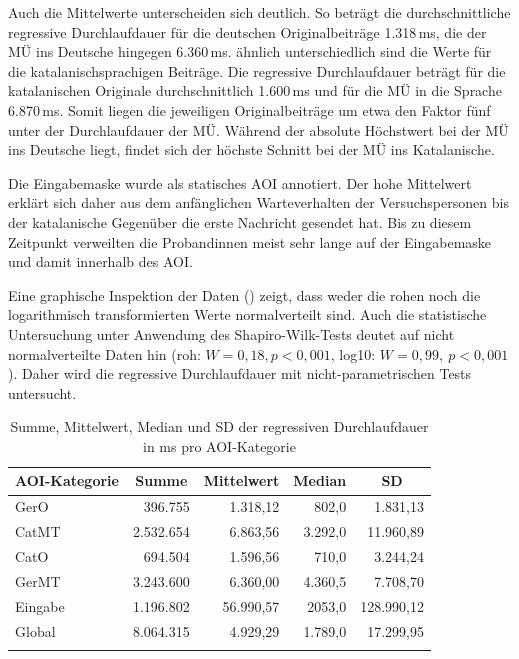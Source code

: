 Auch die Mittelwerte unterscheiden sich deutlich. So beträgt die durchschnittliche regressive Durchlaufdauer für die deutschen Originalbeiträge 1.318\,ms, die der MÜ ins Deutsche hingegen 6.360\,ms. ähnlich unterschiedlich sind die Werte für die katalanischsprachigen Beiträge. Die regressive Durchlaufdauer beträgt für die katalanischen Originale durchschnittlich 1.600\,ms und für die MÜ in die Sprache 6.870\,ms. Somit liegen die jeweiligen Originalbeiträge um etwa den Faktor fünf unter der Durchlaufdauer der MÜ. Während der absolute Höchstwert bei der MÜ ins Deutsche liegt, findet sich der höchste Schnitt bei der MÜ ins Katalanische.

Die Eingabemaske wurde als statisches AOI annotiert. Der hohe Mittelwert erklärt sich daher aus dem anfänglichen Warteverhalten der Versuchspersonen bis der katalanische Gegenüber die erste Nachricht gesendet hat. Bis zu diesem Zeitpunkt verweilten die Proband{\textperiodcentered}innen meist sehr lange auf der Eingabemaske und damit innerhalb des AOI.

Eine graphische Inspektion der Daten () zeigt, dass weder die rohen noch die logarithmisch transformierten Werte normalverteilt sind. Auch die statistische Untersuchung unter Anwendung des Shapiro-Wilk-Tests deutet auf nicht normalverteilte Daten hin (roh: $W = 0,18, p < 0,001$, log10: $W = 0,99,\allowbreak\ p < 0,001$). Daher wird die regressive Durchlaufdauer mit nicht-parametrischen Tests untersucht.


\begin{table}
    \begin{tabular}{lrrrr}  
    \lsptoprule
        {AOI-Kategorie} & \multicolumn{1}{c}{Summe} & \multicolumn{1}{c}{Mittelwert} & \multicolumn{1}{c}{Median} & \multicolumn{1}{c}{SD} \\ 
        \midrule
        GerO   & 396.755 & 1.318,12 & 802,0 & 1.831,13 \\ 
        CatMT   & 2.532.654 & 6.863,56 & 3.292,0 & 11.960,89 \\ 
        CatO 	& 694.504 & 1.596,56 & 710,0 & 3.244,24 \\ 
        GerMT	& 3.243.600 & 6.360,00 & 4.360,5 &  7.708,70\\ 
        Eingabe   & 1.196.802 & 56.990,57 & 2053,0 & 128.990,12 \\ 
        \midrule
        Global  & 8.064.315 & 4.929,29 & 1.789,0 & 17.299,95\\ 
        \lspbottomrule
    \end{tabular}
        \caption[Summe, Mittelwert, Median und SD der regressiven Durchlaufdauer]{Summe, Mittelwert, Median und SD der regressiven Durchlaufdauer in ms pro AOI-Kategorie\label{K6:tab:CatDe:mean-sd-iaregpd}}
\end{table}
	


